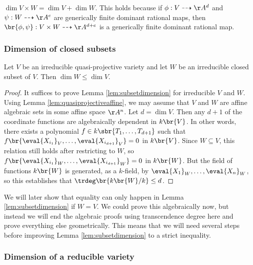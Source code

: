 \begin{fact*}
$ \dim V \times W = \dim V + \dim W $. This holds because if $ \phi : V \dashrightarrow \AA^d $ and $ \psi : W \dashrightarrow \AA^e $ are generically finite dominant rational maps, then $ \br{\phi, \psi} : V \times W \dashrightarrow \AA^{d + e} $ is a generically finite dominant rational map.
\end{fact*}

\subsubsection{Dimension of closed subsets}

\begin{lemma}
\label{lem:subsetdimension}
Let $ V $ be an irreducible quasi-projective variety and let $ W $ be an irreducible closed subset of $ V $. Then $ \dim W \le \dim V $.
\end{lemma}

\begin{proof}
It suffices to prove Lemma \ref{lem:subsetdimension} for irreducible $ V $ and $ W $. Using Lemma \ref{lem:quasiprojectiveaffine}, we may assume that $ V $ and $ W $ are affine algebraic sets in some affine space $ \AA^n $. Let $ d = \dim V $. Then any $ d + 1 $ of the coordinate functions are algebraically dependent in $ k\br{V} $. In other words, there exists a polynomial $ f \in k\sbr{T_1, \dots, T_{d + 1}} $ such that $ f\br{\eval{X_{i_1}}_V, \dots, \eval{X_{i_{d + 1}}}_V} = 0 $ in $ k\br{V} $. Since $ W \subseteq V $, this relation still holds after restricting to $ W $, so $ f\br{\eval{X_{i_1}}_W, \dots, \eval{X_{i_{d + 1}}}_W} = 0 $ in $ k\br{W} $. But the field of functions $ k\br{W} $ is generated, as a $ k $-field, by $ \eval{X_1}_W, \dots, \eval{X_n}_W $, so this establishes that $ \trdeg\br{k\br{W} / k} \le d $.
\end{proof}

We will later show that equality can only happen in Lemma \ref{lem:subsetdimension} if $ W = V $. We could prove this algebraically now, but instead we will end the algebraic proofs using transcendence degree here and prove everything else geometrically. This means that we will need several steps before improving Lemma \ref{lem:subsetdimension} to a strict inequality.

\pagebreak

\subsubsection{Dimension of a reducible variety}

